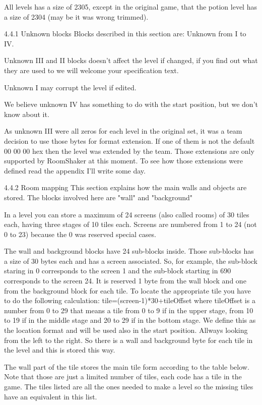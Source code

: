  All levels has a size of 2305, except in the original game, that the
 potion level has a size of 2304 (may be it was wrong trimmed).

4.4.1 Unknown blocks
 Blocks described in this section are: Unknown from I to IV.

 Unknown III and II blocks doesn't affect the level if changed, if you find
 out what they are used to we will welcome your specification text.

 Unknown I may corrupt the level if edited.

 We believe unknown IV has something to do with the start position, but we
 don't know about it.

 As unknown III were all zeros for each level in the original set, it was a
 team decision to use those bytes for format extension. If one of them is
 not the default 00 00 00 hex then the level was extended by the team.
 Those extensions are only supported by RoomShaker at this  moment. To see
 how those extensions were defined read the appendix I'll write some day.

4.4.2 Room mapping
 This section explains how the main walls and objects are stored. The
 blocks involved here are "wall" and "background"

 In a level you can store a maximum of 24 screens (also called rooms) of 30
 tiles each, having three stages of 10 tiles each. Screens are numbered
 from 1 to 24 (not 0 to 23) because the 0 was reserved special cases.

 The wall and background blocks have 24 sub-blocks inside. Those sub-blocks
 has a size of 30 bytes each and has a screen associated. So, for example,
 the sub-block staring in 0 corresponds to the screen 1 and the sub-block
 starting in 690 corresponds to the screen 24.
 It is reserved 1 byte from the wall block and one from the background
 block for each tile. To locate the appropriate tile you have to do the
 following calculation: tile=(screen-1)*30+tileOffset where tileOffset is a
 number
 from 0 to 29 that means a tile from 0 to 9 if in the upper stage, from
 10 to 19 if in the middle stage and 20 to 29 if in the bottom stage.
 We define this as the location format and will be used also in the start
 position.
 Allways looking from the left to the right.
 So there is a wall and background byte for each tile in the level and this
 is stored this way.

 The wall part of the tile stores the main tile form according to the table
 below. Note that those are just a limited number of tiles, each code has a
 tile in the game. The tiles listed are all the ones needed to make a level
 so the missing tiles have an equivalent in this list.

